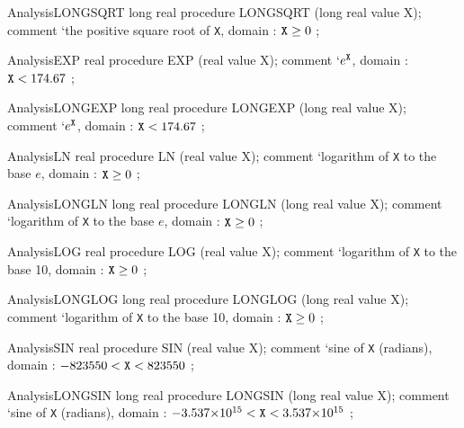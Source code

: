 \documentclass[a4paper]{article}
\begin{document}
\begin{ProcedureDeclaration}{Analysis}{LONGSQRT}
long real procedure LONGSQRT (long real value X);
comment `\rm the positive square root of {\tt X}, domain : ${\tt X} \ge 0$ ;
\end{ProcedureDeclaration}

\begin{ProcedureDeclaration}{Analysis}{EXP}
real procedure EXP (real value X);
comment `\rm $e^{\tt X}$, domain : ${\tt X} < 174.67$ ;
\end{ProcedureDeclaration}

\begin{ProcedureDeclaration}{Analysis}{LONGEXP}
long real procedure LONGEXP (long real value X);
comment `\rm $e^{\tt X}$, domain : ${\tt X} < 174.67$ ;
\end{ProcedureDeclaration}

\begin{ProcedureDeclaration}{Analysis}{LN}
real procedure LN (real value X);
comment `\rm logarithm of {\tt X} to the base $e$, domain : ${\tt X} \ge 0$ ;
\end{ProcedureDeclaration}

\begin{ProcedureDeclaration}{Analysis}{LONGLN}
long real procedure LONGLN (long real value X);
comment `\rm logarithm of {\tt X} to the base $e$, domain : ${\tt X} \ge 0$ ;
\end{ProcedureDeclaration}

\begin{ProcedureDeclaration}{Analysis}{LOG}
real procedure LOG (real value X);
comment `\rm logarithm of {\tt X} to the base 10, domain : ${\tt X} \ge 0$ ;
\end{ProcedureDeclaration}

\begin{ProcedureDeclaration}{Analysis}{LONGLOG}
long real procedure LONGLOG (long real value X);
comment `\rm logarithm of {\tt X} to the base 10, domain : ${\tt X} \ge 0$ ;
\end{ProcedureDeclaration}

\begin{ProcedureDeclaration}{Analysis}{SIN}
real procedure SIN (real value X);
comment `\rm sine of {\tt X} (radians), domain : $-823550 < {\tt X} < 823550$ ;
\end{ProcedureDeclaration}

\begin{ProcedureDeclaration}{Analysis}{LONGSIN}
long real procedure LONGSIN (long real value X);
comment `\rm sine of {\tt X} (radians), domain : $-3.537{\times}10^{15} < {\tt X} < 3.537{\times}10^{15}$ ;
\end{ProcedureDeclaration}
\end{document}

